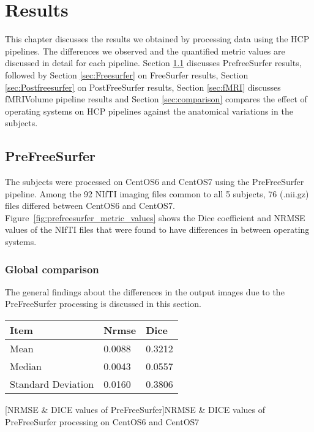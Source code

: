 \chapter{Results}\label{results}
This chapter discusses the results we obtained by processing data using the HCP pipelines. The differences we observed and the quantified metric values are discussed in detail for each pipeline. Section \ref{sec:Prefreesurfer} discusses PrefreeSurfer results, followed by Section \ref{sec:Freesurfer} on FreeSurfer results, Section \ref{sec:Postfreesurfer} on PostFreeSurfer results, Section \ref{sec:fMRI} discusses fMRIVolume pipeline results and Section \ref{sec:comparison} compares the effect of operating systems on HCP pipelines against the anatomical variations in the subjects.

\section{PreFreeSurfer} \label{sec:Prefreesurfer}
The subjects were processed on CentOS6 and CentOS7 using the PreFreeSurfer pipeline. Among the 92 NIfTI imaging files common to all 5 subjects, 76 (.nii.gz) files differed between CentOS6 and CentOS7. Figure~\ref{fig:prefreesurfer_metric_values} shows the Dice coefficient and NRMSE values of the NIfTI files that were found to have differences in between operating systems.

\subsection{Global comparison}
The general findings about the differences in the output images due to the PreFreeSurfer processing is discussed in this section.

\begin{center}
\begin{tabular}{|l|l|l|}
\hline
\textbf{Item}      & \textbf{Nrmse} & \textbf{Dice} \\ \hline
Mean               & 0.0088   & 0.3212   \\ \hline
Median             & 0.0043    & 0.0557    \\ \hline
Standard Deviation & 0.0160    & 0.3806   \\ \hline
\end{tabular}
[NRMSE \& DICE values of PreFreeSurfer]{NRMSE \& DICE values of PreFreeSurfer processing on CentOS6 and CentOS7}
\label{tab:PreFreeSurfer_Metic_Values}
\end{center}


